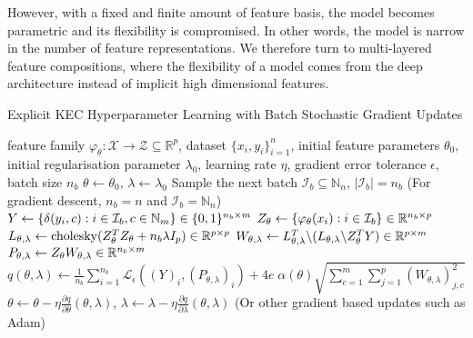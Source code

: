 \documentclass{article}
\numberwithin{equation}{section}
\numberwithin{table}{section}
\numberwithin{algorithm}{section}
\begin{document}
		However, with a fixed and finite amount of feature basis, the model becomes parametric and its flexibility is compromised. In other words, the model is narrow in the number of feature representations. We therefore turn to multi-layered feature compositions, where the flexibility of a model comes from the deep architecture instead of implicit high dimensional features.

		\begin{algorithm}[tb]
			\caption{Explicit KEC Hyperparameter Learning with Batch Stochastic Gradient Updates}
			\label{alg:explicit_kernel_embedding_classifier_training}
			\begin{algorithmic}[1]
				 feature family $\varphi_{\theta} : \mathcal{X} \to \mathcal{Z} \subseteq \mathbb{R}^{p}$, dataset $\{x_{i}, y_{i}\}_{i = 1}^{n}$, initial feature parameters $\theta_{0}$, initial regularisation parameter $\lambda_{0}$, learning rate $\eta$, gradient error tolerance $\epsilon$, batch size $n_{b}$
				\STATE $\theta \leftarrow \theta_{0}$, $\lambda \leftarrow \lambda_{0}$
				\REPEAT
				\STATE Sample the next batch $\mathcal{I}_{b} \subseteq \mathbb{N}_{n}$, $| \mathcal{I}_{b} | = n_{b}$ \hspace{\fill} (For gradient descent, $n_{b} = n$ and $\mathcal{I}_{b} = \mathbb{N}_{n}$)
				\STATE $Y \leftarrow \{\delta(y_{i}, c) : i \in \mathcal{I}_{b}, c \in \mathbb{N}_{m}\} \hspace{\fill} \in \{0, 1\}^{n_{b} \times m}$
				\STATE $Z_{\theta} \leftarrow \{\varphi_{\theta}(x_{i}) : i \in \mathcal{I}_{b}\} \hspace{\fill} \in \mathbb{R}^{n_{b} \times p}$
				\STATE $L_{\theta, \lambda} \leftarrow \mathrm{cholesky}(Z_{\theta}^{T} Z_{\theta} + n_{b} \lambda I_{p}) \hspace{\fill} \in \mathbb{R}^{p \times p}$
				\STATE $W_{\theta, \lambda} \leftarrow L_{\theta, \lambda}^{T} \backslash (L_{\theta, \lambda} \backslash Z_{\theta}^{T} Y) \hspace{\fill} \in \mathbb{R}^{p \times m}$
				\STATE $P_{\theta, \lambda} \leftarrow Z_{\theta} W_{\theta, \lambda} \hspace{\fill} \in \mathbb{R}^{n_{b} \times m}$
				\STATE $q(\theta, \lambda) \leftarrow \frac{1}{n_{b}} \sum_{i = 1}^{n_{b}} \mathcal{L}_{\epsilon}((Y)_{i}, (P_{\theta, \lambda})_{i}) + 4 e \; \alpha(\theta) \sqrt{\sum_{c = 1}^{m} \sum_{j = 1}^{p} (W_{\theta, \lambda})_{j, c}^{2}}$
				\STATE $\theta \leftarrow \theta - \eta \frac{\partial q}{\partial \theta}(\theta, \lambda)$, $\lambda \leftarrow \lambda - \eta \frac{\partial q}{\partial \lambda}(\theta, \lambda)$ \hspace{\fill} (Or other gradient based updates such as Adam)

\end{algorithmic}
\end{algorithm}
\end{document}
